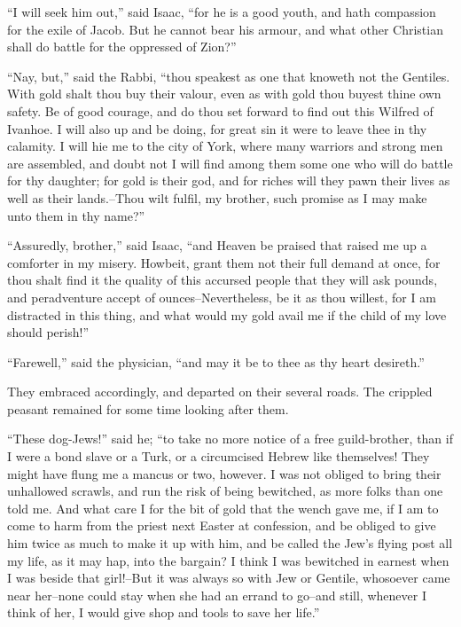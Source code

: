 ``I will seek him out,'' said Isaac, ``for he is a good youth, and hath
compassion for the exile of Jacob. But he cannot bear his armour, and
what other Christian shall do battle for the oppressed of Zion?''

``Nay, but,'' said the Rabbi, ``thou speakest as one that knoweth not
the Gentiles. With gold shalt thou buy their valour, even as with gold
thou buyest thine own safety. Be of good courage, and do thou set
forward to find out this Wilfred of Ivanhoe. I will also up and be
doing, for great sin it were to leave thee in thy calamity. I will hie
me to the city of York, where many warriors and strong men are
assembled, and doubt not I will find among them some one who will do
battle for thy daughter; for gold is their god, and for riches will they
pawn their lives as well as their lands.--Thou wilt fulfil, my brother,
such promise as I may make unto them in thy name?''

``Assuredly, brother,'' said Isaac, ``and Heaven be praised that raised
me up a comforter in my misery. Howbeit, grant them not their full
demand at once, for thou shalt find it the quality of this accursed
people that they will ask pounds, and peradventure accept of
ounces--Nevertheless, be it as thou willest, for I am distracted in this
thing, and what would my gold avail me if the child of my love should
perish!''

``Farewell,'' said the physician, ``and may it be to thee as thy heart
desireth.''

They embraced accordingly, and departed on their several roads. The
crippled peasant remained for some time looking after them.

``These dog-Jews!'' said he; ``to take no more notice of a free
guild-brother, than if I were a bond slave or a Turk, or a circumcised
Hebrew like themselves! They might have flung me a mancus or two,
however. I was not obliged to bring their unhallowed scrawls, and run
the risk of being bewitched, as more folks than one told me. And what
care I for the bit of gold that the wench gave me, if I am to come to
harm from the priest next Easter at confession, and be obliged to give
him twice as much to make it up with him, and be called the Jew's flying
post all my life, as it may hap, into the bargain? I think I was
bewitched in earnest when I was beside that girl!--But it was always so
with Jew or Gentile, whosoever came near her--none could stay when she
had an errand to go--and still, whenever I think of her, I would give
shop and tools to save her life.''
